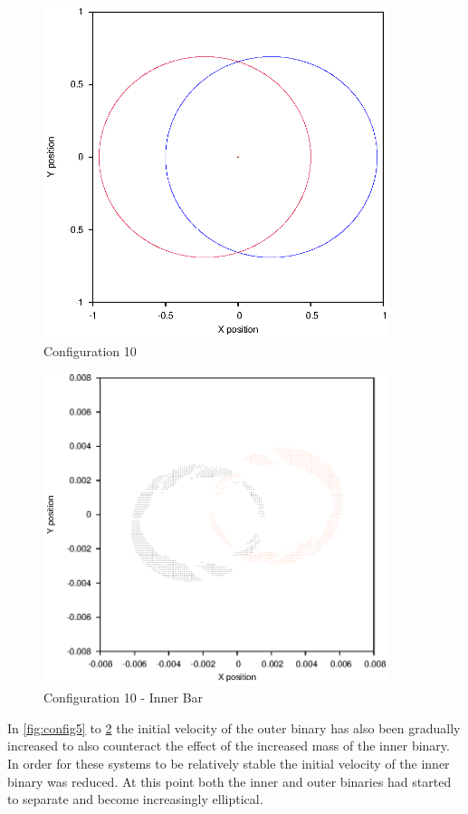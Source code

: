 \documentclass[a4paper,12pt]{article}
\begin{document}
\begin{figure}[H]
\centering
\includegraphics[width=0.9\textwidth]{./2016results/006-6-006-3/Orbit.eps}
\caption{Configuration 10}
\label{fig:config10}
\end{figure}
\begin{figure}[H]
\centering
\includegraphics[width=0.9\textwidth]{./2016results/006-6-006-3/Inner.eps}
\caption{Configuration 10 - Inner Bar}
\label{fig:config10i}
\end{figure}
In \ref{fig:config5} to \ref{fig:config10i} the initial velocity of the outer binary has also been gradually increased to also counteract the effect
of the increased mass of the inner binary. In order for these systems to be relatively stable the initial velocity of the inner binary was reduced. At this point 
both the inner and outer binaries had started to separate and become increasingly elliptical.
\end{document}
